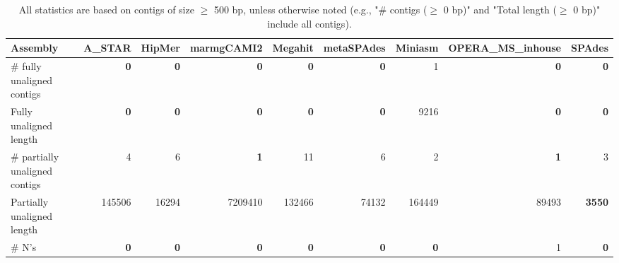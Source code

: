 \documentclass[12pt,a4paper]{article}
\begin{document}
\begin{table}[ht]
\begin{center}
\caption{All statistics are based on contigs of size $\geq$ 500 bp, unless otherwise noted (e.g., "\# contigs ($\geq$ 0 bp)" and "Total length ($\geq$ 0 bp)" include all contigs).}
\begin{tabular}{|l*{8}{|r}|}
\hline
Assembly & A\_STAR & HipMer & marmgCAMI2 & Megahit & metaSPAdes & Miniasm & OPERA\_MS\_inhouse & SPAdes \\ \hline
\# fully unaligned contigs & {\bf 0} & {\bf 0} & {\bf 0} & {\bf 0} & {\bf 0} & 1 & {\bf 0} & {\bf 0} \\ \hline
Fully unaligned length & {\bf 0} & {\bf 0} & {\bf 0} & {\bf 0} & {\bf 0} & 9216 & {\bf 0} & {\bf 0} \\ \hline
\# partially unaligned contigs & 4 & 6 & {\bf 1} & 11 & 6 & 2 & {\bf 1} & 3 \\ \hline
Partially unaligned length & 145506 & 16294 & 7209410 & 132466 & 74132 & 164449 & 89493 & {\bf 3550} \\ \hline
\# N's & {\bf 0} & {\bf 0} & {\bf 0} & {\bf 0} & {\bf 0} & {\bf 0} & 1 & {\bf 0} \\ \hline
\end{tabular}
\end{center}
\end{table}
\end{document}
